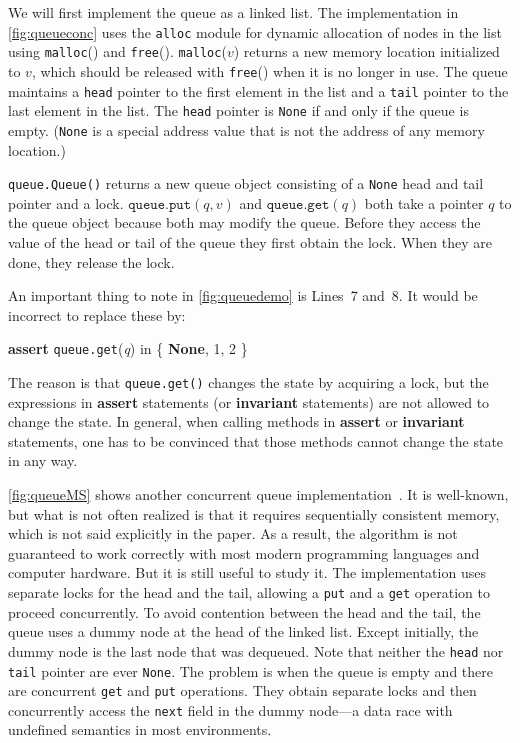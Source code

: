 \documentclass{report}
\newenvironment{code}{
\tcolorbox
}{
\endtcolorbox
}
\begin{document}
We will first implement the queue as a linked list.
The implementation in \autoref{fig:queueconc}
uses the \texttt{alloc} module for dynamic allocation
%
of nodes in the list using \texttt{malloc}() and \texttt{free}().
\texttt{malloc}($v$) returns a new memory location initialized to $v$,
which should be released with \texttt{free}() when it is no longer in use.
The queue maintains a \texttt{head} pointer to the first element in the list
and a \texttt{tail} pointer to the last element in the list.
The \texttt{head} pointer is \texttt{None} if and only if the queue is empty.
(\texttt{None} is a special address value that is not the address of any
memory location.)

\texttt{queue.Queue()} returns a new queue object consisting of a \texttt{None} head
and tail pointer and a lock.
$\mathtt{queue.put}(q, v)$ and $\mathtt{queue.get}(q)$ both take a pointer $q$ to the
queue object because both may modify the queue.
Before they access the value of the head or tail of the queue they first obtain
the lock.
When they are done, they release the lock.

An important thing to note in \autoref{fig:queuedemo}
is Lines~7 and~8.
It would be incorrect to replace these by:

\begin{code}
\textbf{assert} \texttt{queue.get}(\textit{q}) in \{ \textbf{None}, 1, 2 \}
\end{code}

The reason is that \texttt{queue.get()} changes the state by
acquiring a lock, but the expressions in \textbf{assert}
statements (or \textbf{invariant} statements)
are not allowed to change the state.
In general, when calling methods in \textbf{assert} or
\textbf{invariant} statements, one has to be convinced that
those methods cannot change the state in any way.

\autoref{fig:queueMS} shows another
concurrent queue implementation~\cite{MS96}.
It is well-known, but what is not often realized is that
it requires sequentially consistent memory, which is not
said explicitly in the paper.
As a result, the algorithm is not guaranteed to work
correctly with most modern programming languages and
computer hardware.  But it is still useful to study it.
The implementation uses separate
locks for the head and the tail,
allowing a \texttt{put} and a \texttt{get} operation
to proceed concurrently.  To avoid contention between the head and the tail,
the queue uses a dummy node at the head of the linked list.
Except initially, the dummy node is the last node that was dequeued.
Note that neither the \texttt{head} nor \texttt{tail} pointer are
ever \texttt{None}.
The problem is when the queue is empty and there are concurrent
\texttt{get} and \texttt{put} operations.
They obtain separate locks and then concurrently access the
\texttt{next} field in the dummy node---a data race with
undefined semantics in most environments.
\end{document}
